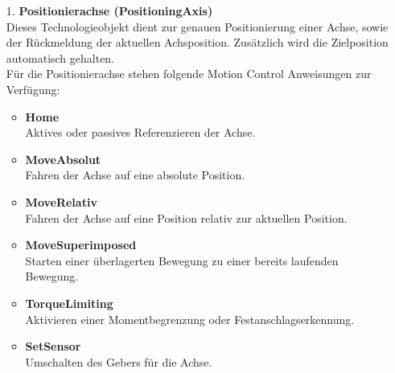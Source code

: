     \begin{itemize}

        \item[1.] \textbf{Positionierachse (PositioningAxis)} \\
            Dieses Technologieobjekt dient zur genauen Positionierung einer Achse, sowie der Rückmeldung der aktuellen Achsposition. Zusätzlich wird die Zielposition automatisch gehalten. \\
            Für die Positionierachse stehen folgende Motion Control Anweisungen zur Verfügung: 
            \begin{itemize}
                \item \textbf{Home} \\ 
                    Aktives oder passives Referenzieren der Achse.
                \item \textbf{MoveAbsolut} \\
                    Fahren der Achse auf eine absolute Position.
                \item \textbf{MoveRelativ} \\ 
                    Fahren der Achse auf eine Position relativ zur aktuellen Position.
                \item \textbf{MoveSuperimposed} \\
                    Starten einer überlagerten Bewegung zu einer bereits laufenden Bewegung.
                \item \textbf{TorqueLimiting} \\
                    Aktivieren einer Momentbegrenzung oder Festanschlagserkennung.
                \item \textbf{SetSensor} \\
                    Umschalten des Gebers für die Achse. 
            \end{itemize}
            


\end{itemize}
